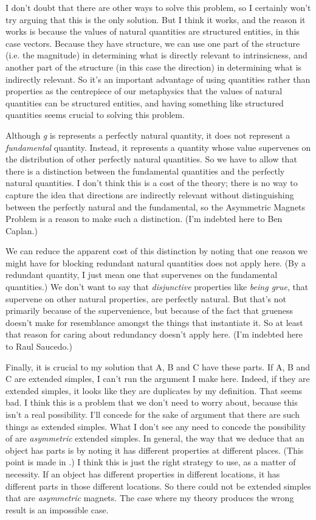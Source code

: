 I don't doubt that there are other ways to solve this problem, so I certainly won't try arguing that this is the only solution. But I think it works, and the reason it works is because the values of natural quantities are structured entities, in this case vectors. Because they have structure, we can use one part of the structure (i.e. the magnitude) in determining what is directly relevant to intrinsicness, and another part of the structure (in this case the direction) in determining what is indirectly relevant. So it's an important advantage of using quantities rather than properties as the centrepiece of our metaphysics that the values of natural quantities can be structured entities, and having something like structured quantities seems crucial to solving this problem.

Although \textit{g} is represents a perfectly natural quantity, it does not represent a \textit{fundamental} quantity. Instead, it represents a quantity whose value supervenes on the distribution of other perfectly natural quantities. So we have to allow that there is a distinction between the fundamental quantities and the perfectly natural quantities. I don't think this is a cost of the theory; there is no way to capture the idea that directions are indirectly relevant without distinguishing between the perfectly natural and the fundamental, so the Asymmetric Magnets Problem is a reason to make such a distinction. (I'm indebted here to Ben Caplan.)

We can reduce the apparent cost of this distinction by noting that one reason we might have for blocking redundant natural quantities does not apply here. (By a redundant quantity, I just mean one that supervenes on the fundamental quantities.) We don't want to say that \textit{disjunctive} properties like \textit{being grue}, that supervene on other natural properties, are perfectly natural. But that's not primarily because of the supervenience, but because of the fact that grueness doesn't make for resemblance amongst the things that instantiate it. So at least that reason for caring about redundancy doesn't apply here. (I'm indebted here to Raul Saucedo.)

Finally, it is crucial to my solution that A, B and C have these parts. If A, B and C are extended simples, I can't run the argument I make here. Indeed, if they are extended simples, it looks like they are duplicates by my definition. That seems bad. I think this is a problem that we don't need to worry about, because this isn't a real possibility. I'll concede for the sake of argument that there are such things as extended simples. What I don't see any need to concede the possibility of are \textit{asymmetric} extended simples. In general, the way that we deduce that an object has parts is by noting it has different properties at different places. (This point is made in \citet{Sider2003}.) I think this is just the right strategy to use, as a matter of necessity. If an object has different properties in different locations, it has different parts in those different locations. So there could not be extended simples that are\textit{ asymmetric} magnets. The case where my theory produces the wrong result is an impossible case.

